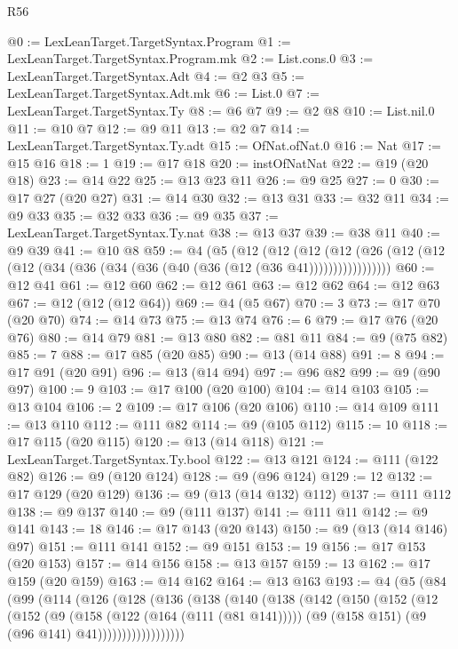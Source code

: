 \begin{lexlean}{R56}
\begin{coremodule}
@0 := LexLeanTarget.TargetSyntax.Program
@1 := LexLeanTarget.TargetSyntax.Program.mk
@2 := List.cons.{0}
@3 := LexLeanTarget.TargetSyntax.Adt
@4 := @2 @3
@5 := LexLeanTarget.TargetSyntax.Adt.mk
@6 := List.{0}
@7 := LexLeanTarget.TargetSyntax.Ty
@8 := @6 @7
@9 := @2 @8
@10 := List.nil.{0}
@11 := @10 @7
@12 := @9 @11
@13 := @2 @7
@14 := LexLeanTarget.TargetSyntax.Ty.adt
@15 := OfNat.ofNat.{0}
@16 := Nat
@17 := @15 @16
@18 := 1
@19 := @17 @18
@20 := instOfNatNat
@22 := @19 (@20 @18)
@23 := @14 @22
@25 := @13 @23 @11
@26 := @9 @25
@27 := 0
@30 := @17 @27 (@20 @27)
@31 := @14 @30
@32 := @13 @31
@33 := @32 @11
@34 := @9 @33
@35 := @32 @33
@36 := @9 @35
@37 := LexLeanTarget.TargetSyntax.Ty.nat
@38 := @13 @37
@39 := @38 @11
@40 := @9 @39
@41 := @10 @8
@59 := @4
    (@5
      (@12
        (@12
          (@12 (@12 (@26 (@12 (@12 (@12 (@34 (@36 (@34 (@36 (@40 (@36 (@12 (@36 @41)))))))))))))))))
@60 := @12 @41
@61 := @12 @60
@62 := @12 @61
@63 := @12 @62
@64 := @12 @63
@67 := @12 (@12 (@12 @64))
@69 := @4 (@5 @67)
@70 := 3
@73 := @17 @70 (@20 @70)
@74 := @14 @73
@75 := @13 @74
@76 := 6
@79 := @17 @76 (@20 @76)
@80 := @14 @79
@81 := @13 @80
@82 := @81 @11
@84 := @9 (@75 @82)
@85 := 7
@88 := @17 @85 (@20 @85)
@90 := @13 (@14 @88)
@91 := 8
@94 := @17 @91 (@20 @91)
@96 := @13 (@14 @94)
@97 := @96 @82
@99 := @9 (@90 @97)
@100 := 9
@103 := @17 @100 (@20 @100)
@104 := @14 @103
@105 := @13 @104
@106 := 2
@109 := @17 @106 (@20 @106)
@110 := @14 @109
@111 := @13 @110
@112 := @111 @82
@114 := @9 (@105 @112)
@115 := 10
@118 := @17 @115 (@20 @115)
@120 := @13 (@14 @118)
@121 := LexLeanTarget.TargetSyntax.Ty.bool
@122 := @13 @121
@124 := @111 (@122 @82)
@126 := @9 (@120 @124)
@128 := @9 (@96 @124)
@129 := 12
@132 := @17 @129 (@20 @129)
@136 := @9 (@13 (@14 @132) @112)
@137 := @111 @112
@138 := @9 @137
@140 := @9 (@111 @137)
@141 := @111 @11
@142 := @9 @141
@143 := 18
@146 := @17 @143 (@20 @143)
@150 := @9 (@13 (@14 @146) @97)
@151 := @111 @141
@152 := @9 @151
@153 := 19
@156 := @17 @153 (@20 @153)
@157 := @14 @156
@158 := @13 @157
@159 := 13
@162 := @17 @159 (@20 @159)
@163 := @14 @162
@164 := @13 @163
@193 := @4
    (@5
      (@84
        (@99
          (@114
            (@126
              (@128
                (@136
                  (@138
                    (@140
                      (@138
                        (@142
                          (@150
                            (@152
                              (@12
                                (@152
                                  (@9
                                    (@158 (@122 (@164 (@111 (@81 @141)))))
                                    (@9 (@158 @151) (@9 (@96 @141) @41))))))))))))))))))

\end{coremodule}
\end{lexlean}
